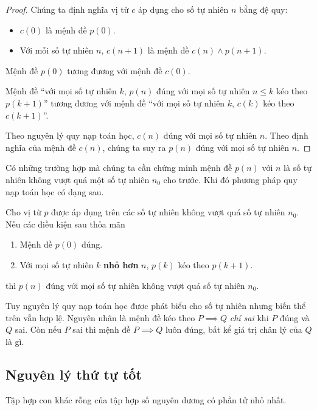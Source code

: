 \begin{proof}
    Chúng ta định nghĩa vị từ $c$ áp dụng cho số tự nhiên $n$ bằng đệ quy:
    \begin{itemize}
        \item $c(0)$ là mệnh đề $p(0)$.
        \item Với mỗi số tự nhiên $n$, $c(n+1)$ là mệnh đề $c(n)\wedge p(n+1)$.
    \end{itemize}

    Mệnh đề $p(0)$ tương đương với mệnh đề $c(0)$.

    Mệnh đề ``với mọi số tự nhiên $k$, $p(n)$ đúng với mọi số tự nhiên $n\leq k$ kéo theo $p(k+1)$'' tương đương với mệnh đề ``với mọi số tự nhiên $k$, $c(k)$ kéo theo $c(k+1)$''.

    Theo nguyên lý quy nạp toán học, $c(n)$ đúng với mọi số tự nhiên $n$. Theo định nghĩa của mệnh đề $c(n)$, chúng ta suy ra $p(n)$ đúng với mọi số tự nhiên $n$.
\end{proof}

Có những trường hợp mà chúng ta cần chứng minh mệnh đề $p(n)$ với $n$ là số tự nhiên không vượt quá một số tự nhiên $n_{0}$ cho trước. Khi đó phương pháp quy nạp toán học có dạng sau.
\begin{theorem}
    Cho vị từ $p$ được áp dụng trên các số tự nhiên không vượt quá số tự nhiên $n_{0}$. Nếu các điều kiện sau thỏa mãn
    \begin{enumerate}[label={(\roman*)}]
        \item Mệnh đề $p(0)$ đúng.
        \item Với mọi số tự nhiên $k$ \textbf{nhỏ hơn} $n$, $p(k)$ kéo theo $p(k+1)$.
    \end{enumerate}

    thì $p(n)$ đúng với mọi số tự nhiên không vượt quá số tự nhiên $n_{0}$.
\end{theorem}

Tuy nguyên lý quy nạp toán học được phát biểu cho số tự nhiên nhưng biến thể trên vẫn hợp lệ. Nguyên nhân là mệnh đề kéo theo $P\implies Q$ \textit{chỉ sai} khi $P$ đúng và $Q$ sai. Còn nếu $P$ sai thì mệnh đề $P\implies Q$ luôn đúng, bất kể giá trị chân lý của $Q$ là gì.

\subsection{Nguyên lý thứ tự tốt}

\begin{theorem}
    Tập hợp con khác rỗng của tập hợp số nguyên dương có phần tử nhỏ nhất.
\end{theorem}

